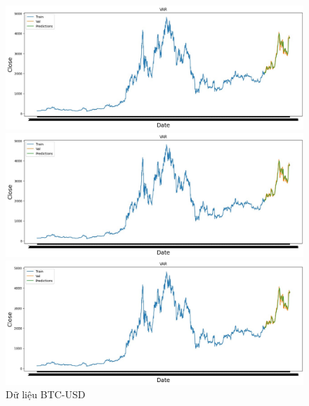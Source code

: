 \documentclass[conference]{IEEEtran}
\begin{document}
	\begin{figure}[H]
		\centering
		\begin{minipage}{0.15\textwidth}
			\centering
			\includegraphics[width=1\textwidth]{Figure/BTC_VAR.jpg}
		\end{minipage}
		\hfill
		\begin{minipage}{0.15\textwidth}
			\centering
			\includegraphics[width=1\textwidth]{Figure/BTC_VAR.jpg}
		\end{minipage}
		\hfill
		\begin{minipage}{0.15\textwidth}
			\centering
			\includegraphics[width=1\textwidth]{Figure/BNB_VAR.jpg}
		\end{minipage}
		\caption{Dữ liệu BTC-USD}
		\label{fig:1}
	\end{figure}
	
\end{document}
